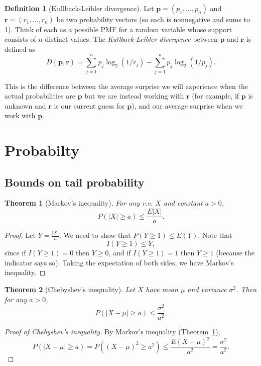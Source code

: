 \documentclass{./utils/mydoc}
\numberwithin{equation}{section} %
\newtheorem{theorem}{Theorem}[section]
\theoremstyle{definition}
\newtheorem*{definition}{Definition} %
\theoremstyle{remark}
\begin{document}
\begin{definition}[Kullback-Leibler divergence]
  Let $\mathbf{p} = (p_1, \dots, p_n)$ and $\mathbf{r} = (r_1, \dots, r_n)$ be two probability vectors (so each is nonnegative and sums to 1). Think of each as a possible PMF for a random variable whose support consists of $n$ distinct values. The \emph{Kullback-Leibler divergence} between $\mathbf{p}$ and $\mathbf{r}$ is defined as
\[
  D(\mathbf{p}, \mathbf{r}) = \sum_{j=1}^n p_j \log_2 (1 / r_j) -
    \sum_{j=1}^n p_j \log_2 (1 / p_j).
\]
\end{definition}
This is the difference between the average surprise we will experience when the
actual probabilities are $\mathbf{p}$ but we are instead working with 
$\mathbf{r}$ (for example, if $\mathbf{p}$ is unknown and $\mathbf{r}$ is our 
current guess for $\mathbf{p}$), and our average surprise when we work with 
$\mathbf{p}$.

\section{Probabilty}

\subsection{Bounds on tail probability}

\begin{theorem}[Markov's inequality] \label{thm:markov-inequality}
For any r.v. $X$ and constant $a > 0$,
\begin{equation}
  P(|X| \ge a) \le \frac{E|X|}{a}.
\end{equation}
\end{theorem}
\begin{proof}
  Let $Y = \frac{|X|}{a}$. We need to show that $P(Y\ge 1) \le E(Y)$. Note that
  \[ I(Y \ge 1) \le Y, \]
  since if $I(Y \ge 1) = 0$ then $Y \ge 0$, and if $I(Y \ge 1) = 1$ then $Y \ge 1$ (because the indicator says so). Taking the expectation of both sides, we have Markov’s inequality.
\end{proof}


\begin{theorem}[Chebyshev's inequality]
  Let $X$ have mean $\mu$ and variance $\sigma^2$. Then for any $a > 0$,
  \begin{equation}
    P(|X-\mu| \ge a) \le \frac{\sigma^2}{a^2}.
  \end{equation}
\end{theorem}
\begin{proof}[Proof of Chebyshev's inequality]
  By Markov's inequality (Theorem~\ref{thm:markov-inequality}),
  \[
    P(|X-\mu|\ge a) = P((X-\mu)^2 \ge a^2) 
    \le \frac{E(X-\mu)^2}{a^2} = \frac{\sigma^2}{a^2}.
  \]
\end{proof}
\end{document}
